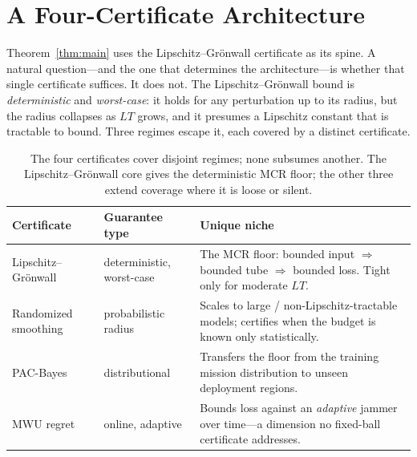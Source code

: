 \documentclass[conference]{IEEEtran}
\begin{document}
\section{A Four-Certificate Architecture}
\label{sec:certs}
Theorem~\ref{thm:main} uses the Lipschitz--Grönwall certificate as its spine.
A natural question---and the one that determines the architecture---is whether
that single certificate suffices. It does not. The Lipschitz--Grönwall bound is
\emph{deterministic} and \emph{worst-case}: it holds for any perturbation up to
its radius, but the radius collapses as $L T$ grows, and it presumes a Lipschitz
constant that is tractable to bound. Three regimes escape it, each covered by a
distinct certificate.

\begin{table}[t]
\centering
\caption{The four certificates cover disjoint regimes; none subsumes another.
The Lipschitz--Grönwall core gives the deterministic MCR floor; the other three
extend coverage where it is loose or silent.}
\label{tab:certs}
\small
\renewcommand{\arraystretch}{1.2}
\begin{tabularx}{\columnwidth}{@{}
  >{\hsize=0.82\hsize\raggedright\arraybackslash}X
  >{\hsize=0.70\hsize\raggedright\arraybackslash}X
  >{\hsize=1.48\hsize\raggedright\arraybackslash}X@{}}
\toprule
\textbf{Certificate} & \textbf{Guarantee type} & \textbf{Unique niche}\\
\midrule
Lipschitz--Grönwall & deterministic, worst-case & The MCR floor: bounded input $\Rightarrow$ bounded tube $\Rightarrow$ bounded loss. Tight only for moderate $LT$.\\
Randomized smoothing~\cite{cohen2019smoothing} & probabilistic radius & Scales to large / non-Lipschitz-tractable models; certifies when the budget is known only statistically.\\
PAC-Bayes~\cite{viallard2021pacbayes} & distributional & Transfers the floor from the training mission distribution to unseen deployment regions.\\
MWU regret~\cite{arora2012mwu,balcan2015commitment} & online, adaptive & Bounds loss against an \emph{adaptive} jammer over time---a dimension no fixed-ball certificate addresses.\\
\bottomrule
\end{tabularx}
\end{table}
\end{document}
